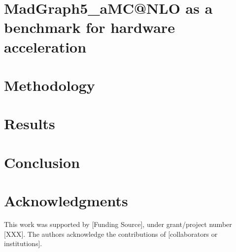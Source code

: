 \documentclass[11pt,a4paper]{article}
\begin{document}

\section{MadGraph5\_aMC@NLO as a benchmark for hardware acceleration}



\section{Methodology} 


\section{Results}


\section{Conclusion}

\section*{Acknowledgments}
This work was supported by [Funding Source], under grant/project number [XXX]. The authors acknowledge the contributions of [collaborators or institutions].



\end{document}
